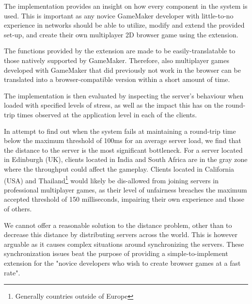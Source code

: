 \documentclass[bsc, 12pt, twoside, singlespacing, parskip, abbrevs, notimes, normalheadings, logo]{styles/infthesis}
\begin{document}
The implementation provides an insight on how every component in the system is used. This is important as any novice GameMaker developer with little-to-no experience in networks should be able to utilize, modify and extend the provided set-up, and create their own multiplayer 2D browser game using the extension.

The functions provided by the extension are made to be easily-translatable to those natively supported by GameMaker. Therefore, also multiplayer games developed with GameMaker that did previously not work in the browser can be translated into a browser-compatible version within a short amount of time.

The implementation is then evaluated by inspecting the server's behaviour when loaded with specified levels of stress, as well as the impact this has on the round-trip times observed at the application level in each of the clients.

In attempt to find out when the system fails at maintaining a round-trip time below the maximum threshold of 100ms for an average server load, we find that the distance to the server is the most significant bottleneck. For a server located in Edinburgh (UK), clients located in India and South Africa are in the gray zone where the throughput could affect the gameplay. Clients located in California (USA) and Thailand\footnote{Generally countries outside of Europe} would likely be dis-allowed from joining servers in professional multiplayer games, as their level of unfairness breaches the maximum accepted threshold of 150 milliseconds, impairing their own experience and those of others.

We cannot offer a reasonable solution to the distance problem, other than to decrease this distance by distributing servers across the world. This is however arguable as it causes complex situations around synchronizing the servers. These synchronization issues beat the purpose of providing a simple-to-implement extension for the "novice developers who wish to create browser games at a fast rate".


\end{document}
